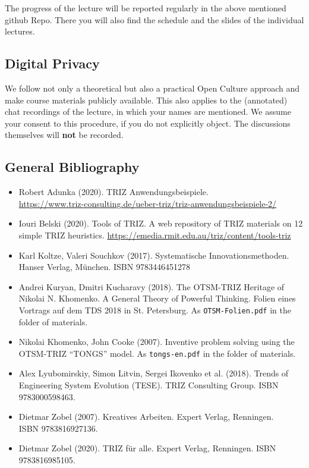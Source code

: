 \documentclass[11pt,a4paper]{article}
\begin{document}
The progress of the lecture will be reported regularly in the above mentioned
github Repo. There you will also find the schedule and the slides of the
individual lectures.

\subsection{Digital Privacy}

We follow not only a theoretical but also a practical Open Culture approach
and make course materials publicly available.  This also applies to the
(annotated) chat recordings of the lecture, in which your names are mentioned.
We assume your consent to this procedure, if you do not explicitly object.
The discussions themselves will \textbf{not} be recorded.

\subsection{General Bibliography}

\begin{itemize}[noitemsep]
\item Robert Adunka (2020). TRIZ Anwendungsbeispiele. \\
  \url{https://www.triz-consulting.de/ueber-triz/triz-anwendungsbeispiele-2/} 
\item Iouri Belski (2020). Tools of TRIZ. A web repository of TRIZ materials
  on 12 simple TRIZ heuristics.
  \url{https://emedia.rmit.edu.au/triz/content/tools-triz}
\item Karl Koltze, Valeri Souchkov (2017). Systematische Innovationsmethoden.
  Hanser Verlag, München. ISBN 9783446451278
\item Andrei Kuryan, Dmitri Kucharavy (2018). The OTSM-TRIZ Heritage of
  Nikolai N. Khomenko. A General Theory of Powerful Thinking. Folien eines
  Vortrags auf dem TDS 2018 in St. Petersburg. As \texttt{OTSM-Folien.pdf} in
  the folder of materials.
\item Nikolai Khomenko, John Cooke (2007). Inventive problem solving using the
  OTSM-TRIZ “TONGS” model.  As \texttt{tongs-en.pdf} in the folder of
  materials.
\item Alex Lyubomirskiy, Simon Litvin, Sergei Ikovenko et al. (2018). Trends
  of Engineering System Evolution (TESE).  TRIZ Consulting Group. ISBN
  9783000598463.
\item Dietmar Zobel (2007). Kreatives Arbeiten. Expert Verlag, Renningen.\\
  ISBN 9783816927136.
\item Dietmar Zobel (2020). TRIZ für alle. Expert Verlag, Renningen. ISBN
  9783816985105.
\end{itemize}
\end{document}
